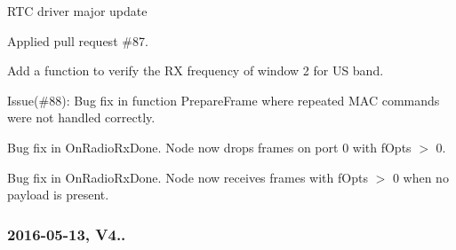 \begin{DoxyItemize}
\begin{DoxyEnumerate}
\item R\+TC driver major update
\item Applied pull request \#87.
\item Add a function to verify the RX frequency of window 2 for US band.
\item Issue(\#88)\+: Bug fix in function Prepare\+Frame where repeated M\+AC commands were not handled correctly.
\item Bug fix in On\+Radio\+Rx\+Done. Node now drops frames on port 0 with f\+Opts $>$ 0.
\item Bug fix in On\+Radio\+Rx\+Done. Node now receives frames with f\+Opts $>$ 0 when no payload is present.
\end{DoxyEnumerate}
\end{DoxyItemize}

\subsubsection*{2016-\/05-\/13, V4..}


